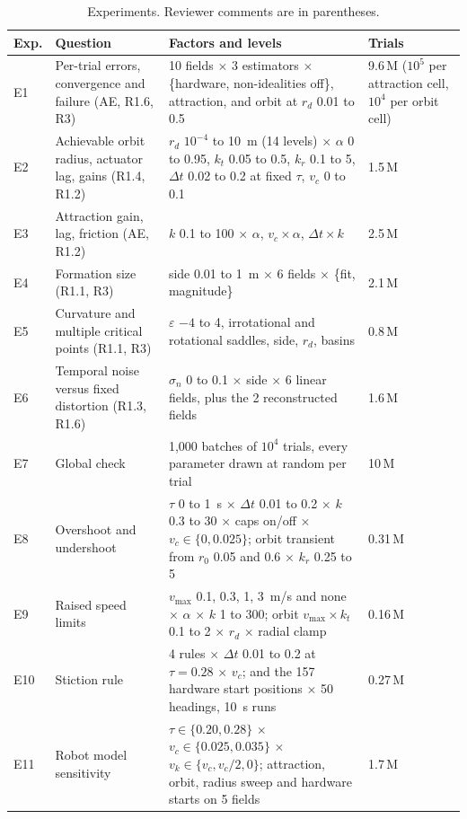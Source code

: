 \documentclass[10pt,letterpaper]{article}
\newcommand{\vmax}{v_{\max}}
\newcommand{\dt}{\Delta t}
\begin{document}
\begin{table}[htbp]
\centering\footnotesize
\caption{Experiments. Reviewer comments are in parentheses.}
\label{tab:exp}
\begin{tabularx}{\textwidth}{@{}l P{4.1cm} L P{3.1cm}@{}}
\toprule
Exp. & Question & Factors and levels & Trials \\
\midrule
E1 & Per-trial errors, convergence and failure (AE, R1.6, R3) & 10 fields $\times$ 3 estimators $\times$ \{hardware, non-idealities off\}, attraction, and orbit at $r_d$ 0.01 to 0.5 & 9.6\,M ($10^5$ per attraction cell, $10^4$ per orbit cell) \\
E2 & Achievable orbit radius, actuator lag, gains (R1.4, R1.2) & $r_d$ $10^{-4}$ to 10~m (14 levels) $\times$ $\alpha$ 0 to 0.95, $k_t$ 0.05 to 0.5, $k_r$ 0.1 to 5, $\dt$ 0.02 to 0.2 at fixed $\tau$, $v_c$ 0 to 0.1 & 1.5\,M \\
E3 & Attraction gain, lag, friction (AE, R1.2) & $k$ 0.1 to 100 $\times$ $\alpha$, $v_c \times \alpha$, $\dt \times k$ & 2.5\,M \\
E4 & Formation size (R1.1, R3) & side 0.01 to 1~m $\times$ 6 fields $\times$ \{fit, magnitude\} & 2.1\,M \\
E5 & Curvature and multiple critical points (R1.1, R3) & $\varepsilon$ $-4$ to 4, irrotational and rotational saddles, side, $r_d$, basins & 0.8\,M \\
E6 & Temporal noise versus fixed distortion (R1.3, R1.6) & $\sigma_n$ 0 to 0.1 $\times$ side $\times$ 6 linear fields, plus the 2 reconstructed fields & 1.6\,M \\
E7 & Global check & 1,000 batches of $10^4$ trials, every parameter drawn at random per trial & 10\,M \\
E8 & Overshoot and undershoot & $\tau$ 0 to 1~s $\times$ $\dt$ 0.01 to 0.2 $\times$ $k$ 0.3 to 30 $\times$ caps on/off $\times$ $v_c \in \{0, 0.025\}$; orbit transient from $r_0$ 0.05 and 0.6 $\times$ $k_r$ 0.25 to 5 & 0.31\,M \\
E9 & Raised speed limits & $\vmax$ 0.1, 0.3, 1, 3~m/s and none $\times$ $\alpha$ $\times$ $k$ 1 to 300; orbit $\vmax \times k_t$ 0.1 to 2 $\times$ $r_d$ $\times$ radial clamp & 0.16\,M \\
E10 & Stiction rule & 4 rules $\times$ $\dt$ 0.01 to 0.2 at $\tau = 0.28$ $\times$ $v_c$; and the 157 hardware start positions $\times$ 50 headings, 10~s runs & 0.27\,M \\
E11 & Robot model sensitivity & $\tau \in \{0.20, 0.28\}$ $\times$ $v_c \in \{0.025, 0.035\}$ $\times$ $v_k \in \{v_c, v_c/2, 0\}$; attraction, orbit, radius sweep and hardware starts on 5 fields & 1.7\,M \\
\bottomrule
\end{tabularx}
\end{table}
\end{document}
